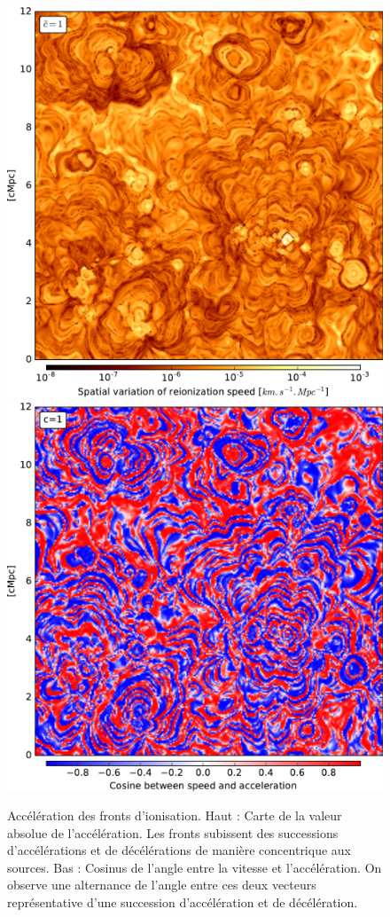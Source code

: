 \begin{figure}
        \includegraphics[height=.45\textheight]{img/04_mapreio/map_acc_c1.pdf} 
        \includegraphics[height=.45\textheight]{img/04_mapreio/map_cos_c1.pdf} 
        \caption[Accélération des fronts]{Accélération des fronts d'ionisation.
        Haut : Carte de la valeur absolue de l'accélération.
		Les fronts subissent des successions d'accélérations et de décélérations de manière concentrique aux sources.        
        Bas : Cosinus de l'angle entre la vitesse et l'accélération.
        On observe une alternance de l'angle entre ces deux vecteurs représentative d'une succession d'accélération et de décélération.
        }
 		\label{fig:accz}
\end{figure}


